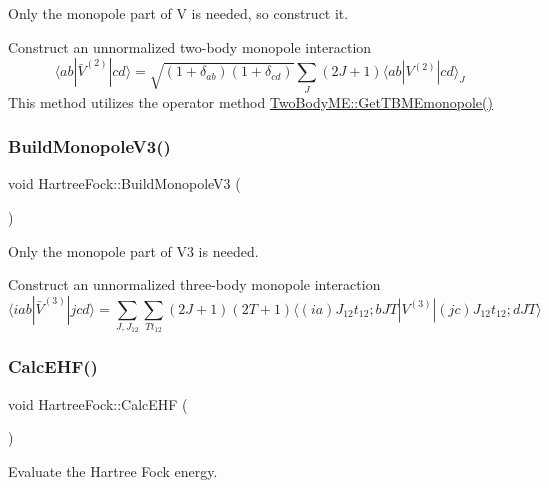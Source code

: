 Only the monopole part of V is needed, so construct it. 

Construct an unnormalized two-\/body monopole interaction \[ \langle ab | \bar{V}^{(2)} | cd \rangle = \sqrt{(1+\delta_{ab})(1+\delta_{cd})} \sum_{J} (2J+1) \langle ab | V^{(2)} | cd \rangle_{J} \] This method utilizes the operator method \hyperlink{classTwoBodyME_a41e1d7a520f31b57283b7817a35bceb7}{Two\+Body\+M\+E\+::\+Get\+T\+B\+M\+Emonopole()} \mbox{\label{classHartreeFock_a1c146af25a09f427cc626d877ec6e518}} 
\subsubsection{\texorpdfstring{Build\+Monopole\+V3()}{BuildMonopoleV3()}}
{\footnotesize\ttfamily void Hartree\+Fock\+::\+Build\+Monopole\+V3 (\begin{DoxyParamCaption}{ }\end{DoxyParamCaption})}



Only the monopole part of V3 is needed. 

Construct an unnormalized three-\/body monopole interaction \[ \langle iab | \bar{V}^{(3)} | jcd \rangle = \sum\limits_{J,J_{12}}\sum_{Tt_{12}}(2J+1)(2T+1) \langle (ia)J_{12}t_{12};b JT| V^{(3)} | (jc)J_{12}t_{12}; d JT\rangle \] \mbox{\label{classHartreeFock_aef506c5c5bc0f317ceb9c71bdc44d62b}} 
\subsubsection{\texorpdfstring{Calc\+E\+H\+F()}{CalcEHF()}}
{\footnotesize\ttfamily void Hartree\+Fock\+::\+Calc\+E\+HF (\begin{DoxyParamCaption}{ }\end{DoxyParamCaption})}



Evaluate the Hartree Fock energy. 

